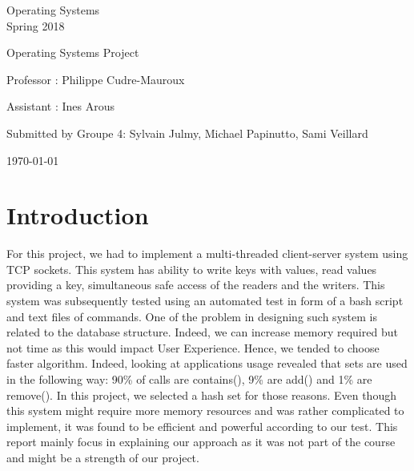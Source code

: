 \documentclass[a4paper,11pt]{report}
\begin{document}
    \begin{center}
        \Large{
            Operating Systems\\
            Spring 2018
        }

        \noindent\makebox[\linewidth]{\rule{\linewidth}{0.4pt}}
        Operating Systems Project
        \noindent\makebox[\linewidth]{\rule{\linewidth}{0.4pt}}

        \begin{flushleft}
            Professor : Philippe Cudre-Mauroux

            Assistant : Ines Arous
        \end{flushleft}

        \noindent\makebox[\linewidth]{\rule{\linewidth}{0.4pt}}

        Submitted by Groupe 4: Sylvain Julmy, Michael Papinutto, Sami Veillard

        \noindent\makebox[\linewidth]{\rule{\textwidth}{1pt}}
        \vspace*{0.8cm}
        \today

    \end{center}

    \newpage

    \section*{Introduction}
    For this project, we had to implement a multi-threaded client-server system using TCP sockets.
    This system has ability to write keys with values, read values providing a key, simultaneous safe access of the
readers and the writers.
    This system was subsequently tested using an automated test in form of a bash script and text files of commands.
    One of the problem in designing such system is related to the database structure.
    Indeed, we can increase memory required but not time as this would impact User Experience.
    Hence, we tended to choose faster algorithm.
    Indeed, looking at applications usage revealed that sets are used in the following way: 90\% of calls are contains(),
    9\% are add() and 1\% are remove(). In this project, we selected a hash set for those reasons.
    Even though this system might require more memory resources and was rather complicated to implement, it was found to
    be efficient and powerful according to our test.
    This report mainly focus in explaining our approach as it was not part of the course and might be a strength of
    our project.
\end{document}
